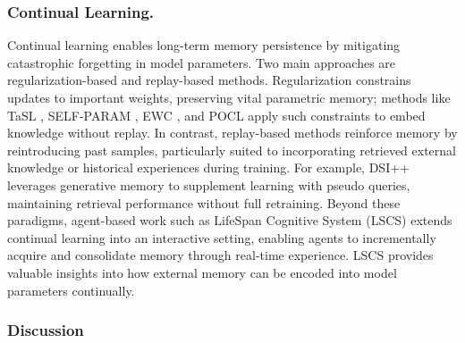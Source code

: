 \documentclass[manuscript,screen]{acmart}
\begin{document}
\subsubsection{Continual Learning.}
Continual learning \citep{wang2024comprehensive} enables long-term memory persistence by mitigating catastrophic forgetting in model parameters. Two main approaches are regularization-based and replay-based methods. Regularization constrains updates to important weights, preserving vital parametric memory; methods like TaSL \citep{feng2024tasl}, SELF-PARAM \citep{wangself}, EWC \citep{kirkpatrick2017overcoming}, and POCL \citep{wu2024mitigating} apply such constraints to embed knowledge without replay. In contrast, replay-based methods reinforce memory by reintroducing past samples, particularly suited to incorporating retrieved external knowledge or historical experiences during training. For example, DSI++ \citep{mehta2022dsi++} leverages generative memory to supplement learning with pseudo queries, maintaining retrieval performance without full retraining. Beyond these paradigms, agent-based work such as LifeSpan Cognitive System (LSCS) \citep{wang2024towards} extends continual learning into an interactive setting, enabling agents to incrementally acquire and consolidate memory through real-time experience. LSCS provides valuable insights into how external memory can be encoded into model parameters continually. 

\subsubsection{Discussion}
\end{document}
